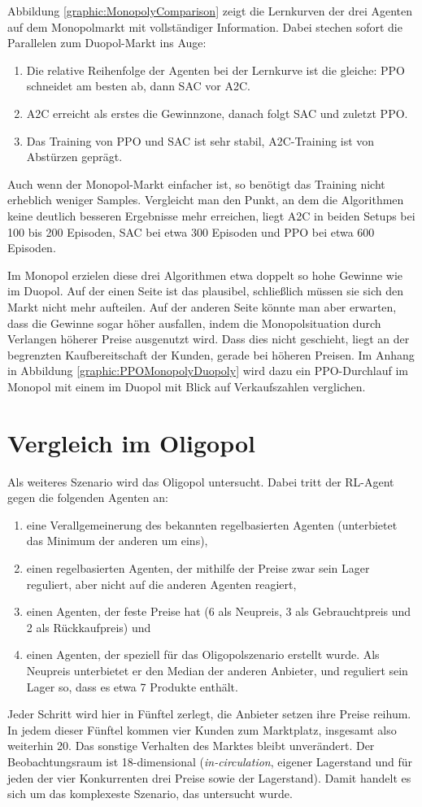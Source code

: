 Abbildung \ref{graphic:MonopolyComparison} zeigt die Lernkurven der drei Agenten auf dem Monopolmarkt mit vollständiger Information.
Dabei stechen sofort die Parallelen zum Duopol-Markt ins Auge:
\begin{enumerate}
	\item Die relative Reihenfolge der Agenten bei der Lernkurve ist die gleiche: PPO schneidet am besten ab, dann SAC vor A2C.
	\item A2C erreicht als erstes die Gewinnzone, danach folgt SAC und zuletzt PPO.
	\item Das Training von PPO und SAC ist sehr stabil, A2C-Training ist von Abstürzen geprägt.
\end{enumerate}
Auch wenn der Monopol-Markt einfacher ist, so benötigt das Training nicht erheblich weniger Samples.
Vergleicht man den Punkt, an dem die Algorithmen keine deutlich besseren Ergebnisse mehr erreichen, liegt A2C in beiden Setups bei 100 bis 200 Episoden, SAC bei etwa 300 Episoden und PPO bei etwa 600 Episoden.

Im Monopol erzielen diese drei Algorithmen etwa doppelt so hohe Gewinne wie im Duopol.
Auf der einen Seite ist das plausibel, schließlich müssen sie sich den Markt nicht mehr aufteilen.
Auf der anderen Seite könnte man aber erwarten, dass die Gewinne sogar höher ausfallen, indem die Monopolsituation durch Verlangen höherer Preise ausgenutzt wird.
Dass dies nicht geschieht, liegt an der begrenzten Kaufbereitschaft der Kunden, gerade bei höheren Preisen.
Im Anhang in Abbildung \ref{graphic:PPOMonopolyDuopoly} wird dazu ein PPO-Durchlauf im Monopol mit einem im Duopol mit Blick auf Verkaufszahlen verglichen.

\section{Vergleich im Oligopol}
Als weiteres Szenario wird das Oligopol untersucht.
Dabei tritt der RL-Agent gegen die folgenden Agenten an:
\begin{enumerate}
	\item eine Verallgemeinerung des bekannten regelbasierten Agenten (unterbietet das Minimum der anderen um eins),
	\item einen regelbasierten Agenten, der mithilfe der Preise zwar sein Lager reguliert, aber nicht auf die anderen Agenten reagiert,
	\item einen Agenten, der feste Preise hat (6 als Neupreis, 3 als Gebrauchtpreis und 2 als Rückkaufpreis) und
	\item einen Agenten, der speziell für das Oligopolszenario erstellt wurde.
	Als Neupreis unterbietet er den Median der anderen Anbieter, und reguliert sein Lager so, dass es etwa 7 Produkte enthält.
\end{enumerate}
Jeder Schritt wird hier in Fünftel zerlegt, die Anbieter setzen ihre Preise reihum.
In jedem dieser Fünftel kommen vier Kunden zum Marktplatz, insgesamt also weiterhin 20.
Das sonstige Verhalten des Marktes bleibt unverändert.
Der Beobachtungsraum ist 18-dimensional (\textit{in-circulation}, eigener Lagerstand und für jeden der vier Konkurrenten drei Preise sowie der Lagerstand).
Damit handelt es sich um das komplexeste Szenario, das untersucht wurde.

